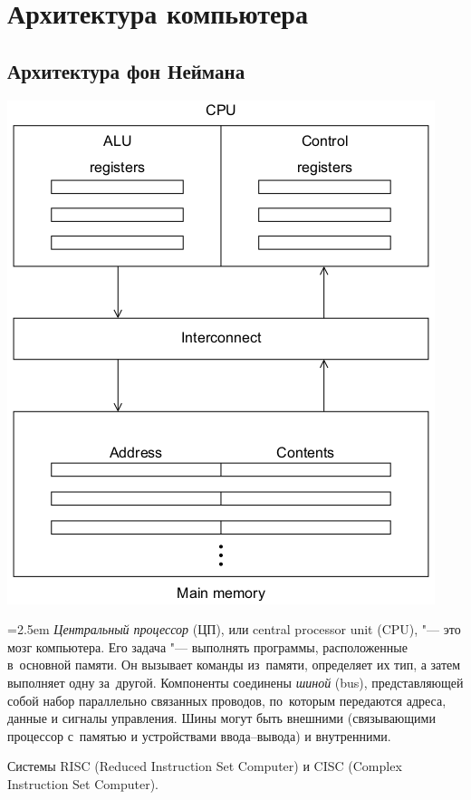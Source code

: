 
\chapter{Архитектура компьютера}

\section{Архитектура фон Неймана}
\noindent
\begin{minipage}{0.4\columnwidth}
  \includegraphics[width=\columnwidth]{images/von_neumann_architecture.png}
\end{minipage}\hfill
\begin{minipage}{0.5\columnwidth}
\parindent=2.5em
\textit{Центральный процессор} (ЦП), или \textenglish{central processor unit} (CPU), "--- это мозг компьютера. Его задача "--- выполнять программы, расположенные в~основной памяти. Он вызывает команды из~памяти, определяет их тип, а затем выполняет одну за~другой. Компоненты соединены \textit{шиной} (\textenglish{bus}), представляющей собой набор параллельно связанных проводов, по~которым передаются адреса, данные и сигналы управления. Шины могут быть внешними (связывающими процессор с~памятью и устройствами ввода--вывода) и внутренними.

Системы RISC (\textenglish{Reduced Instruction Set Computer}) и CISC (\textenglish{Complex Instruction Set Computer}).
\end{minipage}



